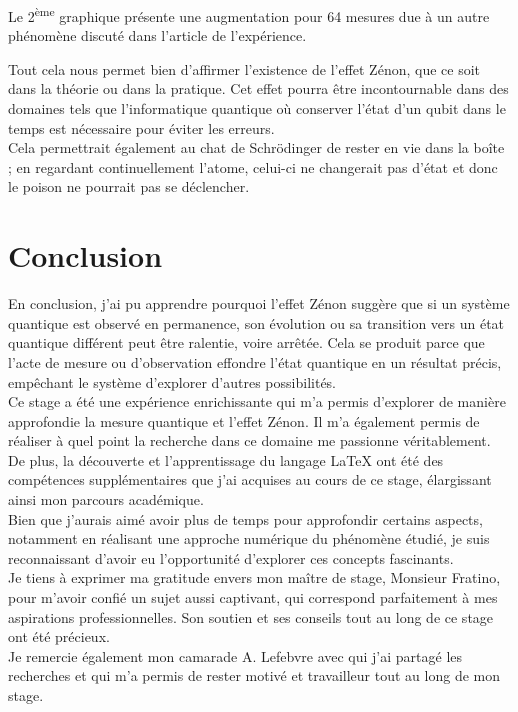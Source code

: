 \documentclass[11pt]{article}
\begin{document}
\qquad Le 2\textsuperscript{ème} graphique présente une augmentation pour 64 mesures due à un autre phénomène discuté dans l'article de l'expérience.

\vspace{1cm}

\qquad Tout cela nous permet bien d'affirmer l'existence de l'effet Zénon, que ce soit dans la théorie ou dans la pratique. Cet effet pourra être incontournable dans des domaines tels que l'informatique quantique où conserver l'état d'un qubit dans le temps est nécessaire pour éviter les erreurs. \\
\qquad Cela permettrait également au chat de Schrödinger de rester en vie dans la boîte ; en regardant continuellement l'atome, celui-ci ne changerait pas d'état et donc le poison ne pourrait pas se déclencher.


\newpage

\section{Conclusion}

\qquad En conclusion, j'ai pu apprendre pourquoi l'effet Zénon suggère que si un système quantique est observé en permanence, son évolution ou sa transition vers un état quantique différent peut être ralentie, voire arrêtée. Cela se produit parce que l’acte de mesure ou d’observation effondre l’état quantique en un résultat précis, empêchant le système d'explorer d'autres possibilités.\\
\vspace{0.3cm}
\qquad Ce stage a été une expérience enrichissante qui m'a permis d'explorer de manière approfondie la mesure quantique et l'effet Zénon. Il m'a également permis de réaliser à quel point la recherche dans ce domaine me passionne véritablement. De plus, la découverte et l'apprentissage du langage LaTeX ont été des compétences supplémentaires que j'ai acquises au cours de ce stage, élargissant ainsi mon parcours académique.\\
\vspace{0.3cm}
\qquad Bien que j'aurais aimé avoir plus de temps pour approfondir certains aspects, notamment en réalisant une approche numérique du phénomène étudié, je suis reconnaissant d'avoir eu l'opportunité d'explorer ces concepts fascinants.\\
\vspace{0.3cm}
\qquad Je tiens à exprimer ma gratitude envers mon maître de stage, Monsieur Fratino, pour m'avoir confié un sujet aussi captivant, qui correspond parfaitement à mes aspirations professionnelles. Son soutien et ses conseils tout au long de ce stage ont été précieux. \\
Je remercie également mon camarade A. Lefebvre avec qui j'ai partagé les recherches et qui m'a permis de rester motivé et travailleur tout au long de mon stage.
\end{document}
